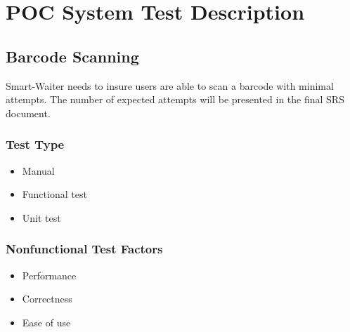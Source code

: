\documentclass[12pt]{article}
\begin{document}
\section{POC System Test Description}


\subsection{Barcode Scanning}
Smart-Waiter needs to insure users are able to scan a barcode with minimal attempts. The number of expected attempts will be presented in the final SRS document.

\subsubsection{Test Type}
\begin{itemize}
  \item Manual
  \item Functional test
  \item Unit test
\end{itemize}

\subsubsection{Nonfunctional Test Factors}
\begin{itemize}
  \item Performance
  \item 	Correctness
  \item 	Ease of use
\end{itemize}

\end{document}
